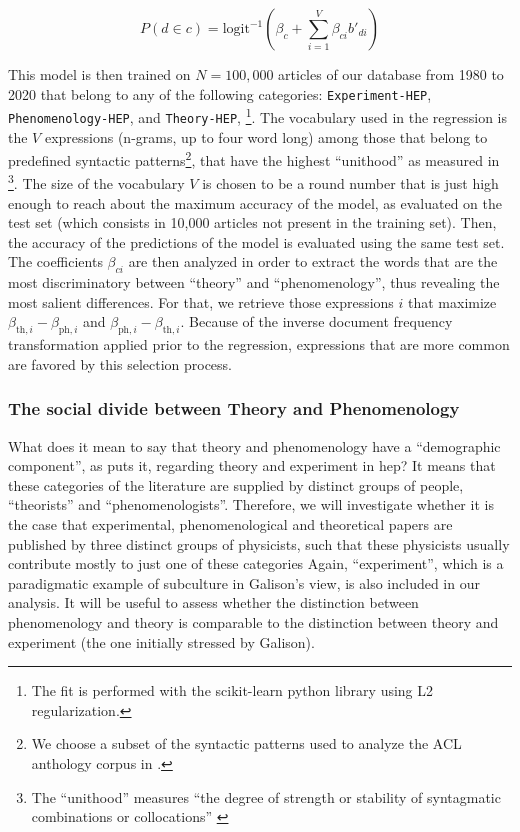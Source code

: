 \documentclass[smallextended]{svjour3}
\begin{document}
\begin{equation}
    \label{eq:logistic_bow_classifier}
    P(d\in c) = \mathrm{logit}^{-1}\left(\beta_c + \sum_{i=1}^V \beta_{ci} b'_{di}  \right)
\end{equation}

This model is then trained on $N=100,000$ articles of our database from 1980 to 2020 that belong to any of the following categories: \texttt{Experiment-HEP}, \texttt{Phenomenology-HEP}, and \texttt{Theory-HEP}, \footnote{The fit is performed with the scikit-learn python library \citep{scikit-learn} using L2 regularization.}. The vocabulary used in the regression is the $V$ expressions (n-grams, up to four word long) among those that belong to predefined syntactic patterns\footnote{We choose a subset of the syntactic patterns used to analyze the ACL anthology corpus in \citealt{omodei_tel-01097702}.}, that have the highest ``unithood'' as measured in \citealt{omodei_tel-01097702}\footnote{The ``unithood'' measures ``the degree of strength or stability of syntagmatic combinations or collocations'' \citep{Kageura1996}}. The size of the vocabulary $V$ is chosen to be a round number that is just high enough to reach about the maximum accuracy of the model, as evaluated on the test set (which consists in 10,000 articles not present in the training set). Then, the accuracy of the predictions of the model is evaluated using the same test set. The coefficients $\beta_{ci}$ are then analyzed in order to extract the words that are the most discriminatory between ``theory'' and ``phenomenology'', thus revealing the most salient differences. For that, we retrieve those expressions $i$ that maximize $\beta_{\text{th},i}-\beta_{\text{ph},i}$ and $\beta_{\text{ph},i}-\beta_{\text{th},i}$. Because of the inverse document frequency transformation applied prior to the regression, expressions that are more common are favored by this selection process.

\subsubsection{The social divide between Theory and Phenomenology}

What does it mean to say that theory and phenomenology have a ``demographic component'', as  \citet[p.~138]{galison1987how} puts it, regarding theory and experiment in \gls{hep}? It means that these categories of the literature are supplied by distinct groups of people, ``theorists'' and ``phenomenologists''. Therefore, we will investigate whether it is the case that experimental, phenomenological and theoretical papers are published by three distinct groups of physicists, such that these physicists usually contribute mostly to just one of these categories Again, ``experiment'', which is a paradigmatic example of subculture in Galison's view, is also included in our analysis. It will be useful to assess whether the distinction between phenomenology and theory is comparable to the distinction between theory and experiment (the one initially stressed by Galison).
\end{document}
